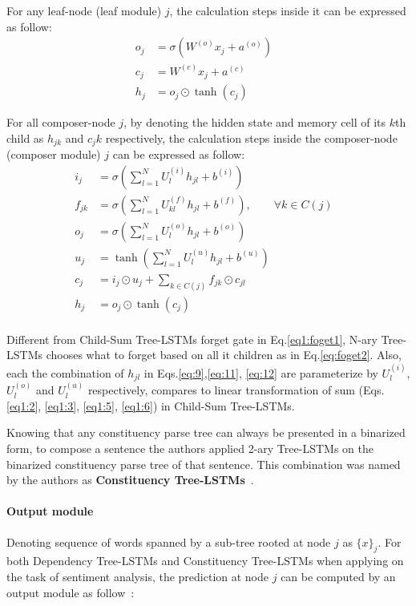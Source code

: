 For any leaf-node (leaf module) \(j\), the calculation steps inside it can be expressed as follow:
\begin{align}
    o_j &= \sigma{\left( W^{(o)} x_j + a^{\left(o\right)}\right)} & \\
       c_j &= W^{(c)} x_j + a^{(c)} & \\
    h_j &= o_j \odot \tanh{\left(c_j\right)} &
\end{align}

For all composer-node \(j\), by denoting the hidden state and memory cell of its \(k\)th child as \(h_{jk}\) and \(c_jk\) respectively, the calculation steps inside the composer-node (composer module) \(j\) can be expressed as follow:
\begin{align}
      i_j &= \sigma{ \left(\sum_{l=1}^{N}U_l^{(i)} h_{jl} + b^{(i)} \right) } &\label{eq:9}\\
      f_{jk} &= \sigma{\left(\sum_{l=1}^{N}U_{kl}^{\left(f\right)} h_{jl} + b^{\left(f\right)}\right)}, \qquad  \forall k \in C(j) & \label{eq:foget2}\\
      o_j &= \sigma{\left( \sum_{l=1}^{N}U_l^{\left(o\right)} h_{jl} + b^{\left(o\right)}\right)} &\label{eq:11}\\
      u_j &= \tanh{\left( \sum_{l=1}^{N}U_l^{\left(u\right)} h_{jl} + b^{\left(u\right)}\right)} &\label{eq:12}\\
       c_j &= i_j \odot u_j + \sum_{k \in C\left(j\right)} f_{jk} \odot c_{jl} & \\
    h_j &= o_j \odot \tanh{\left(c_j\right)} & \\
\end{align}

Different from Child-Sum Tree-LSTMs forget gate in Eq.\eqref{eq1:foget1}, N-ary Tree-LSTMs chooses what to forget based on all it children as in Eq.\eqref{eq:foget2}.
Also, each the combination of \(h_{jl}\) in Eqs.\eqref{eq:9},\eqref{eq:11}, \eqref{eq:12} are parameterize by \(U_l^{(i)}\), \(U_l^{(o)}\) and \(U_l^{(u)}\) respectively, compares to linear transformation of sum (Eqs.\eqref{eq1:2}, \eqref{eq1:3}, \eqref{eq1:5}, \eqref{eq1:6}) in Child-Sum Tree-LSTMs.

Knowing that any constituency parse tree can always be presented in a binarized form, to compose a sentence the authors applied 2-ary Tree-LSTMs on the binarized constituency parse tree of that sentence.
This combination was named by the authors as \textbf{Constituency Tree-LSTMs}~\cite{treeLSTM}.

\paragraph{Output module} Denoting sequence of words spanned by a sub-tree rooted at node \(j\) as \(\{x\}_j\).
For both Dependency Tree-LSTMs and Constituency Tree-LSTMs when applying on the task of sentiment analysis, the prediction at node \(j\) can be computed by an output module as follow~\cite{treeLSTM}:

